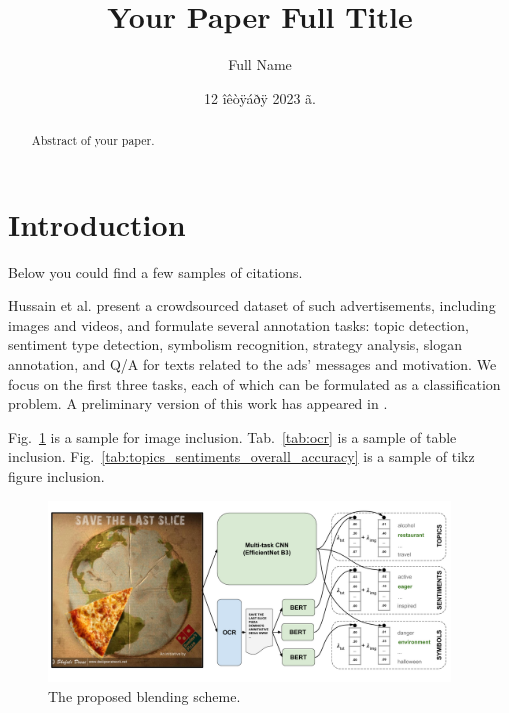\documentclass{zapiski}
\date{12 îêòÿáðÿ 2023 ã.}
\begin{document}
\title[Your Paper Short Title]{Your Paper Full Title}


\author[Author]{Full Name}
\address[F.~Name]{Address}

\begin{abstract}
Abstract of your paper.
\end{abstract}


\maketitle

\section{Introduction}\label{sec:intro}

Below you could find a few samples of citations.

Hussain et al. \cite{hussain2017automatic} present a crowdsourced dataset of such advertisements, including images and videos, and formulate several annotation tasks: topic detection, sentiment type detection, symbolism recognition, strategy analysis, slogan annotation, and Q/A for texts related to the ads' messages and motivation. We focus on the first three tasks, each of which can be formulated as a classification problem.
A preliminary version of this work has appeared in \cite{savchenko2020ad}. 

Fig.~\ref{fig:model} is a sample for image inclusion. Tab.~\ref{tab:ocr} is a sample of table inclusion. Fig.~\ref{tab:topics_sentiments_overall_accuracy} is a sample of tikz figure inclusion.

\begin{figure}[!tbh]
    \centering
    \includegraphics[width=0.95\textwidth]{pic/model.png}\vspace{-.5cm}

    \caption{The proposed blending scheme.}
    \label{fig:model}\vspace{-.3cm}
\end{figure}
\end{document}
